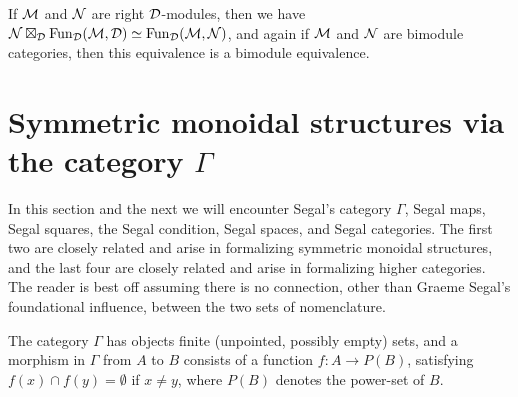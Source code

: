 \documentclass{amsart}
\begin{document}
\begin{remark} \label{remark-tensorasfunctors}
If $\mathcal M$ and $\mathcal N$ are right $\mathcal D$-modules, then we have $\mathcal N \boxtimes_\mathcal D \operatorname{Fun}_{\mathcal D}(\mathcal M,\mathcal D) \simeq \operatorname{Fun}_{\mathcal D}(\mathcal M,\mathcal N)$, and again if $\mathcal M$ and $\mathcal N$ are bimodule categories, then this equivalence is a bimodule equivalence. 
\end{remark}





\section{Symmetric monoidal structures via the category $\Gamma$} \label{sec-symmonGamma}

\begin{warning}
In this section and the next we will encounter Segal's category $\Gamma$, Segal maps, Segal squares, the Segal condition, Segal spaces, and Segal categories.  The first two are closely related and arise in formalizing symmetric monoidal structures, and the last four are closely related and arise in formalizing higher categories.  The reader is best off assuming there is no connection, other than Graeme Segal's foundational influence, between the two sets of nomenclature.
\end{warning}

\begin{definition}
	The category  $\Gamma$ has objects finite (unpointed, possibly empty) sets, and a morphism in $\Gamma$ from $A$ to $B$ consists of a function $f: A \to P(B)$, satisfying $f(x) \cap f(y) = \emptyset$ if $x \neq y$, where $P(B)$ denotes the power-set of $B$. 
\end{definition}
\end{document}
